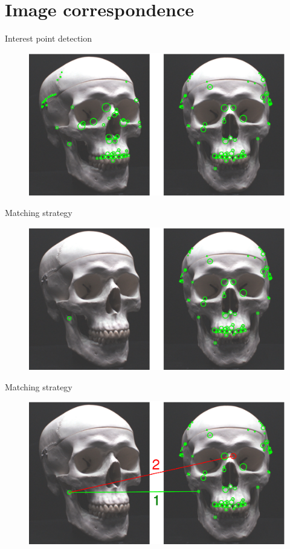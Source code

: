 \documentclass[14pt,t]{beamer}
\begin{document}
\section{Image correspondence}
%
\begin{frame}{Interest point detection}
\begin{figure}
\centering
	\includegraphics[width=\textwidth]{img/imageCorrespondenceInterestPoints.pdf}
\end{figure}
\end{frame}
%
\begin{frame}{Matching strategy}
\begin{figure}
\centering
	\includegraphics[width=\textwidth]{img/imageCorrespondenceExample1.pdf}
\end{figure}
\end{frame}
\begin{frame}{Matching strategy}
\begin{figure}
\centering
	\includegraphics[width=\textwidth]{img/imageCorrespondenceExample2.pdf}
\end{figure}
\end{frame}
\end{document}
